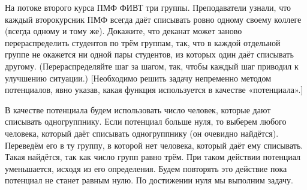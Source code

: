 \begin{task}{15}
На потоке второго курса ПМФ ФИВТ три группы. Преподаватели узнали, что каждый второкурсник ПМФ всегда даёт списывать ровно одному своему коллеге (всегда одному и тому же). Докажите, что деканат может заново перераспределить студентов по трём группам, так, что в каждой отдельной группе не окажется ни одной пары студентов, из которых один даёт списывать другому. (Перераспределяйте шаг за шагом, так, чтобы каждый шаг приводил к улучшению ситуации.) [Необходимо решить задачу непременно методом потенциалов, явно указав, какая функция используется в качестве «потенциала».]
\end{task}

\begin{solution}
В качестве потенциала будем использовать число человек, которые дают списывать одногруппнику.  Если потенциал больше нуля, то выберем любого человека, который даёт списывать одногруппнику (он очевидно найдётся). Переведём его в ту группу, в которой нет человека, который даёт ему списывать. Такая найдётся, так как число групп равно трём. При таком действии потенциал уменьшается, исходя из его определения. Будем повторять это действие пока потенциал не станет равным нулю. По достижении нуля мы выполним задачу. 
\end{solution}